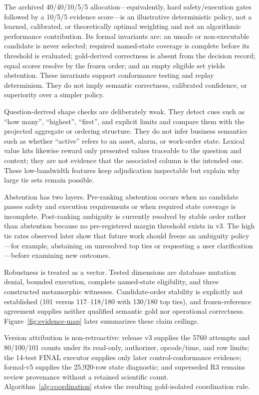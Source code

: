 \documentclass[applsci,article,submit,moreauthors]{Definitions/mdpi}
\begin{document}
The archived 40/40/10/5/5 allocation---equivalently, hard safety/execution gates followed by a 10/5/5 evidence score---is an illustrative deterministic policy, not a learned, calibrated, or theoretically optimal weighting and not an algorithmic performance contribution. Its formal invariants are: an unsafe or non-executable candidate is never selected; required named-state coverage is complete before its threshold is evaluated; gold-derived correctness is absent from the decision record; equal scores resolve by the frozen order; and an empty eligible set yields abstention. These invariants support conformance testing and replay determinism. They do not imply semantic correctness, calibrated confidence, or superiority over a simpler policy.

Question-derived shape checks are deliberately weak. They detect cues such as ``how many'', ``highest'', ``first'', and explicit limits and compare them with the projected aggregate or ordering structure. They do not infer business semantics such as whether ``active'' refers to an asset, alarm, or work-order state. Lexical value hits likewise reward only presented values traceable to the question and context; they are not evidence that the associated column is the intended one. These low-bandwidth features keep adjudication inspectable but explain why large tie sets remain possible.

Abstention has two layers. Pre-ranking abstention occurs when no candidate passes safety and execution requirements or when required state coverage is incomplete. Post-ranking ambiguity is currently resolved by stable order rather than abstention because no pre-registered margin threshold exists in v3. The high tie rates observed later show that future work should freeze an ambiguity policy---for example, abstaining on unresolved top ties or requesting a user clarification---before examining new outcomes.

Robustness is treated as a vector. Tested dimensions are database mutation denial, bounded execution, complete named-state eligibility, and three constructed metamorphic witnesses. Candidate-order stability is explicitly not established (101 versus 117--118/180 with 130/180 top ties), and frozen-reference agreement supplies neither qualified semantic gold nor operational correctness. Figure~\ref{fig:evidence-map} later summarizes these claim ceilings.

Version attribution is non-retroactive: release v3 supplies the 5760 attempts and 80/100/101 counts under its read-only, authorizer, opcode/time, and row limits; the 14-test FINAL executor supplies only later control-conformance evidence; formal-v5 supplies the 25,920-row state diagnostic; and superseded R3 remains review provenance without a retained scientific count. Algorithm~\ref{alg:coordination} states the resulting gold-isolated coordination rule.
\end{document}
